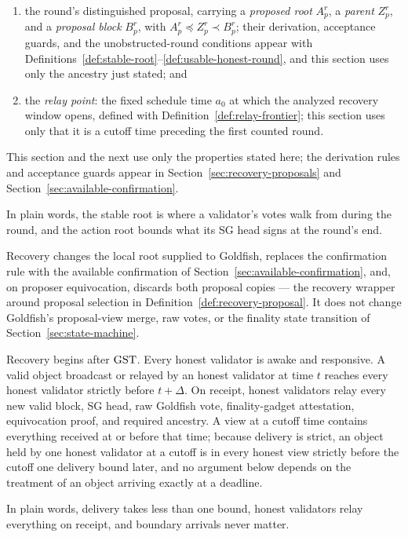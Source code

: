 \begin{definition}
\begin{enumerate}
   Goldfish's confirmation rules --- \(\kappa\)-deep and optimistic
   fast --- throughout recovery;
 \item the round's distinguished proposal, carrying a \emph{proposed
   root} \(A_p^r\), a \emph{parent} \(Z_p^r\), and a
   \emph{proposal block} \(B_p^r\), with
   \(A_p^r\preceq Z_p^r\prec B_p^r\); their derivation, acceptance
   guards, and the unobstructed-round conditions appear with
   Definitions~\ref{def:stable-root}--\ref{def:usable-honest-round},
   and this section uses only the ancestry just stated; and
 \item the \emph{relay point}: the fixed schedule time \(a_0\) at
   which the analyzed recovery window opens, defined with
   Definition~\ref{def:relay-frontier}; this section uses only
   that it is a cutoff time preceding the first counted round.
\end{enumerate}
This section and the next use only the properties stated here;
the derivation rules and acceptance guards appear in
Section~\ref{sec:recovery-proposals} and
Section~\ref{sec:available-confirmation}.

In plain words, the stable root is where a validator's votes walk from
during the round, and the action root bounds what its SG head signs at
the round's end.
\end{definition}

Recovery changes the local root supplied to Goldfish, replaces the
confirmation rule with the available confirmation of
Section~\ref{sec:available-confirmation}, and, on proposer equivocation,
discards both proposal copies --- the recovery wrapper around proposal
selection in Definition~\ref{def:recovery-proposal}.  It does not change
Goldfish's proposal-view merge, raw votes, or the finality state
transition of Section~\ref{sec:state-machine}.

\begin{assumption}\label{ass:recovery-network}
Recovery begins after \(\mathrm{GST}\).  Every honest validator is awake and
responsive.  A valid object broadcast or relayed by an honest validator at
time \(t\) reaches every honest validator strictly before \(t+\Delta\).
On receipt, honest validators relay every new valid block, SG head, raw
Goldfish vote, finality-gadget attestation, equivocation proof, and
required ancestry.  A view at a cutoff time contains everything received
at or before that time; because delivery is strict, an object held by one
honest validator at a cutoff is in every honest view strictly before the
cutoff one delivery bound later, and no argument below depends on the
treatment of an object arriving exactly at a deadline.

In plain words, delivery takes less than one bound, honest validators
relay everything on receipt, and boundary arrivals never matter.
\end{assumption}

